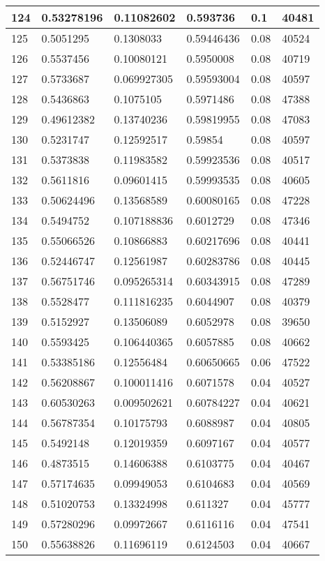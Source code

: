 \begin{longtable}{|l|l|l|l|l|l|}
124 & 0.53278196 & 0.11082602 & 0.593736 & 0.1 & 40481 \\ \hline 
125 & 0.5051295 & 0.1308033 & 0.59446436 & 0.08 & 40524 \\ \hline 
126 & 0.5537456 & 0.10080121 & 0.5950008 & 0.08 & 40719 \\ \hline 
127 & 0.5733687 & 0.069927305 & 0.59593004 & 0.08 & 40597 \\ \hline 
128 & 0.5436863 & 0.1075105 & 0.5971486 & 0.08 & 47388 \\ \hline 
129 & 0.49612382 & 0.13740236 & 0.59819955 & 0.08 & 47083 \\ \hline 
130 & 0.5231747 & 0.12592517 & 0.59854 & 0.08 & 40597 \\ \hline 
131 & 0.5373838 & 0.11983582 & 0.59923536 & 0.08 & 40517 \\ \hline 
132 & 0.5611816 & 0.09601415 & 0.59993535 & 0.08 & 40605 \\ \hline 
133 & 0.50624496 & 0.13568589 & 0.60080165 & 0.08 & 47228 \\ \hline 
134 & 0.5494752 & 0.107188836 & 0.6012729 & 0.08 & 47346 \\ \hline 
135 & 0.55066526 & 0.10866883 & 0.60217696 & 0.08 & 40441 \\ \hline 
136 & 0.52446747 & 0.12561987 & 0.60283786 & 0.08 & 40445 \\ \hline 
137 & 0.56751746 & 0.095265314 & 0.60343915 & 0.08 & 47289 \\ \hline 
138 & 0.5528477 & 0.111816235 & 0.6044907 & 0.08 & 40379 \\ \hline 
139 & 0.5152927 & 0.13506089 & 0.6052978 & 0.08 & 39650 \\ \hline 
140 & 0.5593425 & 0.106440365 & 0.6057885 & 0.08 & 40662 \\ \hline 
141 & 0.53385186 & 0.12556484 & 0.60650665 & 0.06 & 47522 \\ \hline 
142 & 0.56208867 & 0.100011416 & 0.6071578 & 0.04 & 40527 \\ \hline 
143 & 0.60530263 & 0.009502621 & 0.60784227 & 0.04 & 40621 \\ \hline 
144 & 0.56787354 & 0.10175793 & 0.6088987 & 0.04 & 40805 \\ \hline 
145 & 0.5492148 & 0.12019359 & 0.6097167 & 0.04 & 40577 \\ \hline 
146 & 0.4873515 & 0.14606388 & 0.6103775 & 0.04 & 40467 \\ \hline 
147 & 0.57174635 & 0.09949053 & 0.6104683 & 0.04 & 40569 \\ \hline 
148 & 0.51020753 & 0.13324998 & 0.611327 & 0.04 & 45777 \\ \hline 
149 & 0.57280296 & 0.09972667 & 0.6116116 & 0.04 & 47541 \\ \hline 
150 & 0.55638826 & 0.11696119 & 0.6124503 & 0.04 & 40667 \\ \hline 
\end{longtable}